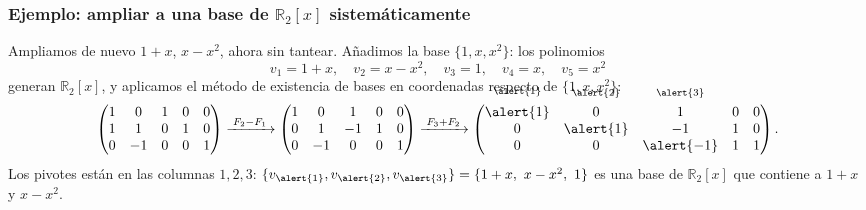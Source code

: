 \begin{frame}
    \frametitle{Ejemplo: ampliar a una base de \(\mathbb{R}_2[x]\) sistemáticamente}

    \begin{example}
        Ampliamos de nuevo \(1+x\), \(x-x^2\), ahora sin tantear. Añadimos
        la base \(\{1,x,x^2\}\): los polinomios
        \[
            v_1=1+x,\quad v_2=x-x^2,\quad v_3=1,\quad v_4=x,\quad v_5=x^2
        \]
        generan \(\mathbb{R}_2[x]\), y aplicamos el método de existencia de
        bases en coordenadas respecto de \(\{1,x,x^2\}\):
        \[
            \begin{pmatrix}
                1&0&1&0&0\\
                1&1&0&1&0\\
                0&-1&0&0&1
            \end{pmatrix}
            \xrightarrow{\;F_2-F_1\;}
            \begin{pmatrix}
                1&0&1&0&0\\
                0&1&-1&1&0\\
                0&-1&0&0&1
            \end{pmatrix}
            \xrightarrow{\;F_3+F_2\;}
            \begin{pmatrix}
                \smash{\overset{\raisebox{1.5ex}{$\scriptstyle\alert{1}$}}{\alert{1}}}&\smash{\overset{\raisebox{1.5ex}{$\scriptstyle\alert{2}$}}{0}}&\smash{\overset{\raisebox{1.5ex}{$\scriptstyle\alert{3}$}}{1}}&0&0\\
                0&\alert{1}&-1&1&0\\
                0&0&\alert{-1}&1&1
            \end{pmatrix}.
        \]
        Los pivotes están en las columnas \(1,2,3\):
        \(\{v_{\alert{1}}, v_{\alert{2}}, v_{\alert{3}}\}=\{1+x,\ x-x^2,\ 1\}\) es una base de \(\mathbb{R}_2[x]\) que
        contiene a \(1+x\) y \(x-x^2\).
    \end{example}
\end{frame}
